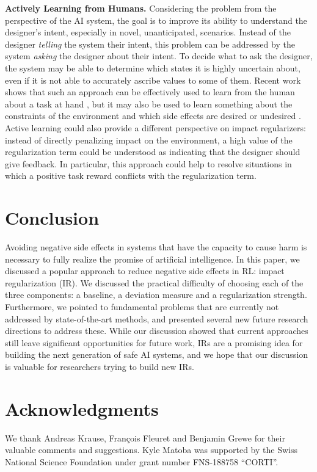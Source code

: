 \documentclass[letterpaper]{article} %
\newcommand{\statement}[1]{\textbf{#1}}
\begin{document}
\statement{Actively Learning from Humans.}
Considering the problem from the perspective of the AI system, the goal is to improve its ability to understand the designer's intent, especially in novel, unanticipated, scenarios. Instead of the designer \emph{telling} the system their intent, this problem can be addressed by the system \emph{asking} the designer about their intent. To decide what to ask the designer, the system may be able to determine which states it is highly uncertain about, even if it is not able to accurately ascribe values to some of them. Recent work shows that such an approach can be effectively used to learn from the human about a task at hand \citep{christiano2017deep}, but it may also be used to learn something about the constraints of the environment and which side effects are desired or undesired \citep{zhang2018minimax}. Active learning could also provide a different perspective on impact regularizers: instead of directly penalizing impact on the environment, a high value of the regularization term could be understood as indicating that the designer should give feedback. In particular, this approach could help to resolve situations in which a positive task reward conflicts with the regularization term.

\section{Conclusion}

Avoiding negative side effects in systems that have the capacity to cause harm is necessary to fully realize the promise of artificial intelligence. In this paper, we discussed a popular approach to reduce negative side effects in RL: impact regularization (IR). We discussed the practical difficulty of choosing each of the three components: a baseline, a deviation measure and a regularization strength. Furthermore, we pointed to fundamental problems that are currently not addressed by state-of-the-art methods, and presented several new future research directions to address these. While our discussion showed that current approaches still leave significant opportunities for future work, IRs are a promising idea for building the next generation of safe AI systems, and we hope that our discussion is valuable for researchers trying to build new IRs.

\section*{Acknowledgments}
We thank Andreas Krause, Fran\c{c}ois Fleuret and Benjamin Grewe for their valuable comments and suggestions. Kyle Matoba was supported by the Swiss National Science Foundation under grant number FNS-188758 ``CORTI''.
\end{document}

